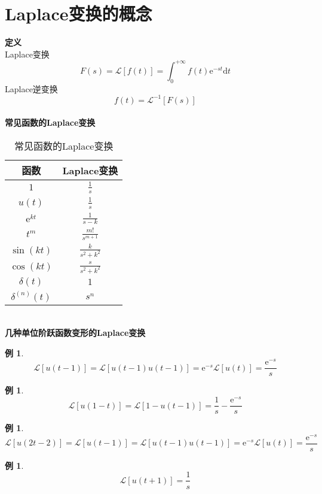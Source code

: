 \documentclass[12pt, a4paper, twoside]{ctexbook}
\newtheorem{example}[theorem]{例}
\begin{document}
\section{Laplace变换的概念}
\textbf{定义}\\
Laplace变换
$$
F\left(s\right)=\mathscr{L}\left[f\left(t\right)\right]=\int_{0}^{+\infty}{f\left(t\right)\mathrm{e}^{-st}\mathrm{d}t}
$$
Laplace逆变换
$$
f\left(t\right)=\mathscr{L}^{-1}\left[F\left(s\right)\right]
$$
~\\

\textbf{常见函数的Laplace变换}
\begin{table}[h]
    \centering
    \caption{常见函数的Laplace变换}\label{常见函数的Laplace变换}
    \begin{tabular}{cc}
        \toprule
        函数 & Laplace变换 \\
        \midrule
        $1$                         & $\frac{1}{s}$           \\
        $u\left(t\right)$           & $\frac{1}{s}$           \\
        $\mathrm{e}^{kt}$           & $\frac{1}{s-k}$         \\
        $t^m$                       & $\frac{m!}{s^{m+1}}$    \\
        $\sin\left(kt\right)$       & $\frac{k}{s^2+k^2}$     \\
        $\cos\left(kt\right)$       & $\frac{s}{s^2+k^2}$     \\
        $\delta\left(t\right)$      & $1$     \\
        $\delta^{\left(n\right)}\left(t\right)$      & $s^n$     \\
        \bottomrule
    \end{tabular}
\end{table}
~\\

\textbf{几种单位阶跃函数变形的Laplace变换}
\begin{example}
    $$\mathscr{L}\left[u\left(t-1\right)\right]=\mathscr{L}\left[u\left(t-1\right)u\left(t-1\right)\right]=\mathrm{e}^{-s}\mathscr{L}\left[u\left(t\right)\right]=\frac{\mathrm{e}^{-s}}{s}$$
\end{example}
\begin{example}
    $$\mathscr{L}\left[u\left(1-t\right)\right]=\mathscr{L}\left[1-u\left(t-1\right)\right]=\frac{1}{s}-\frac{\mathrm{e}^{-s}}{s}$$
\end{example}
\begin{example}
    $$\mathscr{L}\left[u\left(2t-2\right)\right]=\mathscr{L}\left[u\left(t-1\right)\right]=\mathscr{L}\left[u\left(t-1\right)u\left(t-1\right)\right]=\mathrm{e}^{-s}\mathscr{L}\left[u\left(t\right)\right]=\frac{\mathrm{e}^{-s}}{s}$$
\end{example}
\begin{example}
    $$\mathscr{L}\left[u\left(t+1\right)\right]=\frac{1}{s}$$
\end{example}
\end{document}
